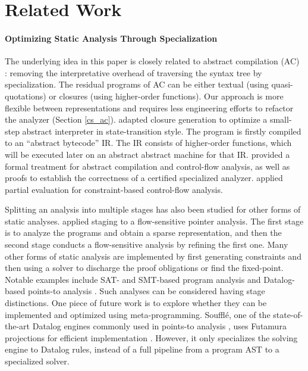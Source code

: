 \section{Related Work}

\paragraph{Optimizing Static Analysis Through Specialization} The underlying
idea in this paper is closely related to abstract compilation (AC)
\cite{Boucher:1996:ACN:647473.727587}: removing the interpretative overhead of
traversing the syntax tree by specialization. The residual programs of AC can
be either textual (using quasi-quotations) or closures (using higher-order
functions).  Our approach is more flexible between representations and requires
less engineering efforts to refactor the analyzer (Section \ref{cs_ac}).
\citet{Johnson:2013:OAA:2500365.2500604} adapted closure generation to optimize a
small-step abstract interpreter in state-transition style. The program
is firstly compiled to an ``abstract bytecode'' IR. The IR consists of higher-order
functions, which will be executed later on an abstract abstract machine for
that IR.  \citet{damian1999partial} provided a formal treatment for abstract
compilation and control-flow analysis, as well as proofs to establish the
correctness of a certified specialized analyzer.  \citet{amtoft1999partial}
applied partial evaluation for constraint-based control-flow analysis.

Splitting an analysis into multiple stages has also been studied for other
forms of static analyses.
\citet{DBLP:conf/cgo/HardekopfL11} applied staging to a
flow-sensitive pointer analysis. The first stage is to analyze the
programs and obtain a sparse representation, and then the second
stage conducts a flow-sensitive analysis by refining the first
one. Many other forms of static analysis are implemented by
first generating constraints and then using a solver to discharge the
proof obligations or find the fixed-point. Notable examples include
SAT- and SMT-based program analysis
\cite{Gulwani:2008:PAC:1375581.1375616} and Datalog-based points-to
analysis \cite{Smaragdakis:2015:PA:2802194.2802195}.
Such analyses can be considered having stage distinctions.  One piece of future
work is to explore whether they can be implemented and optimized using
meta-programming.
Souffl{\'e}, one of the state-of-the-art Datalog engines commonly used in
points-to analysis \cite{Antoniadis:2017:PDS:3088515.3088522}, uses Futamura
projections for efficient implementation \cite{10.1007/978-3-319-41540-6_23}.
However, it only specializes the solving engine to Datalog rules, instead of a
full pipeline from a program AST to a specialized solver.

